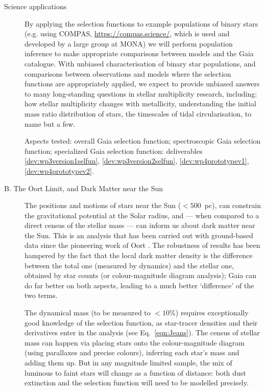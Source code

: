 \begin{workpackage}{Science applications}
\begin{wpobjectives}
\begin{description}
{        By applying the selection functions to example populations of binary stars (e.g. using COMPAS, \url{https://compas.science/}, which is used and developed by a large group at MONA) we will perform population inference to make appropriate comparisons between models and the Gaia catalogue. With unbiased characterisation of binary star populations, and comparisons between observations and models where the selection functions are appropriately applied, we expect to provide unbiased answers to many long-standing questions in stellar multiplicity research, including: 
        how stellar multiplicity changes with metallicity, understanding the initial mass ratio distribution of stars, the timescales of tidal circularisation, to name but a few.
        
        \textsf{Aspects tested: overall Gaia selection function; spectroscopic Gaia selection function; specialized Gaia selection function: deliverables \ref{dev:wp3version1selfun}, \ref{dev:wp3version2selfun}, \ref{dev:wp4prototypev1}, \ref{dev:wp4prototypev2}.}
        }
      
      \item[B. The Oort Limit, and Dark Matter near the Sun]{
        The positions and motions of stars near the Sun ($<500$~pc), can constrain the gravitational potential at the Solar radius, and --- when compared to a direct census of the stellar mass --- can inform us about dark matter near the Sun. This is an analysis that has been carried out with ground-based data since the pioneering work of Oort \citep[e.g.][]{Read2014}. The robustness of results has been hampered by the fact that the local dark matter density is the difference between the total one (measured by dynamics) and the stellar one, obtained by star counts (or colour-magnitude diagram analysis); Gaia can do far better on both aspects, leading to a much better `difference' of the two terms. 
      
        The dynamical mass (to be measured to $<10$\%) requires exceptionally good knowledge of the selection function, as star-tracer densities and their derivatives enter in the analysis (see Eq.~\ref{eqn:Jeans}). The census of stellar mass can happen via placing stars onto the colour-magnitude diagram (using parallaxes and precise colours), inferring each star's mass and adding them up. But in any magnitude limited sample, the mix of luminous to faint stars will change as a function of distance: both dust extinction and the selection function will need to be modelled precisely. 
      
}
\end{description}
\end{wpobjectives}
\end{workpackage}
